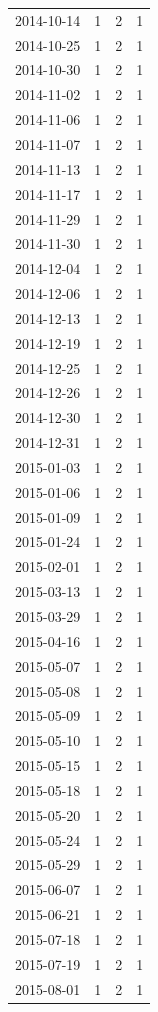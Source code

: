 \begin{tabular}{lrrr}
2014-10-14 & 1 & 2 & 1 \\
2014-10-25 & 1 & 2 & 1 \\
2014-10-30 & 1 & 2 & 1 \\
2014-11-02 & 1 & 2 & 1 \\
2014-11-06 & 1 & 2 & 1 \\
2014-11-07 & 1 & 2 & 1 \\
2014-11-13 & 1 & 2 & 1 \\
2014-11-17 & 1 & 2 & 1 \\
2014-11-29 & 1 & 2 & 1 \\
2014-11-30 & 1 & 2 & 1 \\
2014-12-04 & 1 & 2 & 1 \\
2014-12-06 & 1 & 2 & 1 \\
2014-12-13 & 1 & 2 & 1 \\
2014-12-19 & 1 & 2 & 1 \\
2014-12-25 & 1 & 2 & 1 \\
2014-12-26 & 1 & 2 & 1 \\
2014-12-30 & 1 & 2 & 1 \\
2014-12-31 & 1 & 2 & 1 \\
2015-01-03 & 1 & 2 & 1 \\
2015-01-06 & 1 & 2 & 1 \\
2015-01-09 & 1 & 2 & 1 \\
2015-01-24 & 1 & 2 & 1 \\
2015-02-01 & 1 & 2 & 1 \\
2015-03-13 & 1 & 2 & 1 \\
2015-03-29 & 1 & 2 & 1 \\
2015-04-16 & 1 & 2 & 1 \\
2015-05-07 & 1 & 2 & 1 \\
2015-05-08 & 1 & 2 & 1 \\
2015-05-09 & 1 & 2 & 1 \\
2015-05-10 & 1 & 2 & 1 \\
2015-05-15 & 1 & 2 & 1 \\
2015-05-18 & 1 & 2 & 1 \\
2015-05-20 & 1 & 2 & 1 \\
2015-05-24 & 1 & 2 & 1 \\
2015-05-29 & 1 & 2 & 1 \\
2015-06-07 & 1 & 2 & 1 \\
2015-06-21 & 1 & 2 & 1 \\
2015-07-18 & 1 & 2 & 1 \\
2015-07-19 & 1 & 2 & 1 \\
2015-08-01 & 1 & 2 & 1 \\

\end{tabular}
